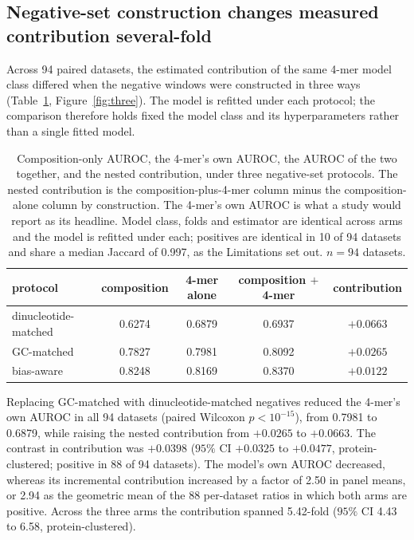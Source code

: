 \subsection{Negative-set construction changes measured contribution several-fold}
\label{sec:threeprotocols}

Across 94 paired datasets, the estimated contribution of the same 4-mer model class differed
when the negative windows were constructed in three ways (Table~\ref{tab:three},
Figure~\ref{fig:three}). The model is refitted under each protocol; the comparison therefore
holds fixed the model class and its hyperparameters rather than a single fitted model.

\begin{table}[htbp]
\centering
\caption{Composition-only AUROC, the 4-mer's own AUROC, the AUROC of the two together, and the
nested contribution, under three negative-set protocols. The nested contribution is the
composition-plus-4-mer column minus the composition-alone
column by construction. The 4-mer's own AUROC is what a study would report as its headline.
Model class, folds and estimator are identical across arms and the model is refitted under each; positives are identical in 10 of 94
datasets and share a median Jaccard of 0.997, as the Limitations set out. $n=94$ datasets.}
\label{tab:three}
\small
\begin{tabular}{lcccc}
\toprule
protocol & composition & 4-mer alone & composition $+$ 4-mer & contribution \\
\midrule
dinucleotide-matched & 0.6274 & 0.6879 & 0.6937 & $+0.0663$ \\
GC-matched & 0.7827 & 0.7981 & 0.8092 & $+0.0265$ \\
bias-aware & 0.8248 & 0.8169 & 0.8370 & $+0.0122$ \\
\bottomrule
\end{tabular}
\end{table}

Replacing GC-matched with dinucleotide-matched negatives reduced the 4-mer's own AUROC in all 94
datasets (paired Wilcoxon $p<10^{-15}$), from 0.7981 to 0.6879, while raising the nested
contribution from $+0.0265$ to $+0.0663$. The contrast in contribution was $+0.0398$ ($95\%$ CI
$+0.0325$ to $+0.0477$, protein-clustered; positive in 88 of 94 datasets). The model's own
AUROC decreased, whereas its incremental contribution increased by a factor of 2.50 in panel
means, or 2.94 as the geometric mean of the 88
per-dataset ratios in which both arms are positive. Across the three arms the contribution spanned 5.42-fold ($95\%$ CI
4.43 to 6.58, protein-clustered).

